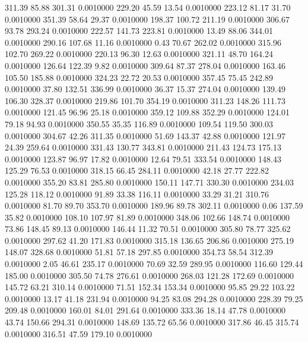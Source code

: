 311.39   85.88  301.31   0.0010000
 229.20   45.59   13.54   0.0010000
 223.12   81.17   31.70   0.0010000
 351.39   58.64   29.37   0.0010000
 198.37  100.72  211.19   0.0010000
 306.67   93.78  293.24   0.0010000
 222.57  141.73  223.81   0.0010000
  13.49   88.06  344.01   0.0010000
 290.16  107.68   11.16   0.0010000
   0.43   70.67  262.02   0.0010000
 315.96  102.70  269.22   0.0010000
 220.13   96.30   12.63   0.0010000
 321.11   48.70  164.24   0.0010000
 126.64  122.39    9.82   0.0010000
 309.64   87.37  278.04   0.0010000
 163.46  105.50  185.88   0.0010000
 324.23   22.72   20.53   0.0010000
 357.45   75.45  242.89   0.0010000
  37.80  132.51  336.99   0.0010000
  36.37   15.37  274.04   0.0010000
 139.49  106.30  328.37   0.0010000
 219.86  101.70  354.19   0.0010000
 311.23  148.26  111.73   0.0010000
 121.45   96.96   25.18   0.0010000
 359.12  109.88  352.29   0.0010000
 124.01   79.18   94.93   0.0010000
 350.55   35.35  116.89   0.0010000
 109.54  119.50  300.03   0.0010000
 304.67   42.26  311.35   0.0010000
  51.69  143.37   42.88   0.0010000
 121.97   24.39  259.64   0.0010000
 331.43  130.77  343.81   0.0010000
 211.43  124.73  175.13   0.0010000
 123.87   96.97   17.82   0.0010000
  12.64   79.51  333.54   0.0010000
 148.43  125.29   76.53   0.0010000
 318.15   66.45  284.11   0.0010000
  42.18   27.77  222.82   0.0010000
 355.20   83.81  285.80   0.0010000
 150.11  147.71  330.30   0.0010000
 234.03  125.28  118.12   0.0010000
  91.89   33.38  116.11   0.0010000
  33.29   31.21  310.76   0.0010000
  81.70   89.70  353.70   0.0010000
 189.96   89.78  302.11   0.0010000
   0.06  137.59   35.82   0.0010000
 108.10  107.97   81.89   0.0010000
 348.06  102.66  148.74   0.0010000
  73.86  148.45   89.13   0.0010000
 146.44   11.32   70.51   0.0010000
 305.80   78.77  325.62   0.0010000
 297.62   41.20  171.83   0.0010000
 315.18  136.65  206.86   0.0010000
 275.19  148.07  328.68   0.0010000
  51.81   57.18  297.85   0.0010000
 354.73   58.54  312.39   0.0010000
   2.05   46.61  235.17   0.0010000
  70.69   32.59  289.95   0.0010000
 116.60  129.44  185.00   0.0010000
 305.50   74.78  276.61   0.0010000
 268.03  121.28  172.69   0.0010000
 145.72   63.21  310.14   0.0010000
  71.51  152.34  153.34   0.0010000
  95.85   29.22  103.22   0.0010000
  13.17   41.18  231.94   0.0010000
  94.25   83.08  294.28   0.0010000
 228.39   79.25  209.48   0.0010000
 160.01   84.01  291.64   0.0010000
 333.36   18.14   47.78   0.0010000
  43.74  150.66  294.31   0.0010000
 148.69  135.72   65.56   0.0010000
 317.86   46.45  315.74   0.0010000
 316.51   47.59  179.10   0.0010000
